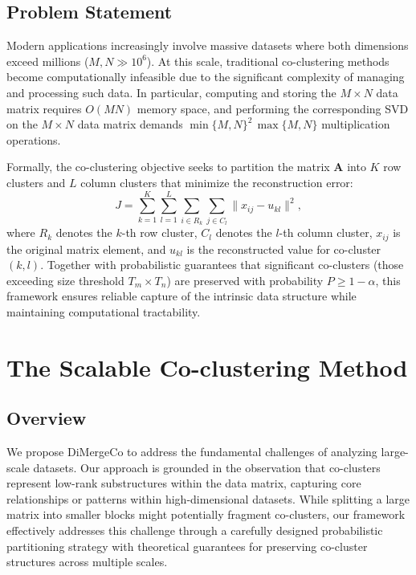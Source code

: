 \documentclass[journal]{IEEEtran}
\theoremstyle{definition}
\theoremstyle{remark} %
\begin{document}
\subsection{Problem Statement}
\label{subsec:problem-statement}
Modern applications increasingly involve massive datasets where both dimensions exceed millions ($M, N \gg 10^6$). At this scale, traditional co-clustering methods become computationally infeasible due to the significant complexity of managing and processing such data. {\color{blue}In particular, computing and storing the $M \times N$ data matrix requires $O(MN)$ memory space, and performing the corresponding SVD on the $M \times N$ data matrix demands $\min\{M,N\}^2\,\max\{M,N\}$ multiplication operations.}

    {\color{blue}Formally, the co-clustering objective seeks to partition the matrix $\mathbf{A}$ into $K$ row clusters and $L$ column clusters that minimize the reconstruction error:
        \begin{equation}\label{eq:co-clustering-objective}
            J = \sum_{k=1}^{K} \sum_{l=1}^{L} \sum_{i \in R_k} \sum_{j \in C_l} \| x_{ij} - u_{kl} \|^2,
        \end{equation}
        where $R_k$ denotes the $k$-th row cluster, $C_l$ denotes the $l$-th column cluster, $x_{ij}$ is the original matrix element, and $u_{kl}$ is the reconstructed value for co-cluster $(k,l)$.}
Together with probabilistic guarantees that significant co-clusters (those exceeding size threshold $T_m \times T_n$) are preserved with probability $P \geq 1 - \alpha$, this framework ensures reliable capture of the intrinsic data structure while maintaining computational tractability.

\section{The Scalable Co-clustering Method}
\label{sec:proposed-model}

\subsection{Overview}
\label{subsec:overview}
We propose DiMergeCo to address the fundamental challenges of analyzing large-scale datasets. Our approach is grounded in the observation that co-clusters represent low-rank substructures within the data matrix, capturing core relationships or patterns within high-dimensional datasets. While splitting a large matrix into smaller blocks might potentially fragment co-clusters, our framework effectively addresses this challenge through a carefully designed probabilistic partitioning strategy with theoretical guarantees for preserving co-cluster structures across multiple scales.
\end{document}
